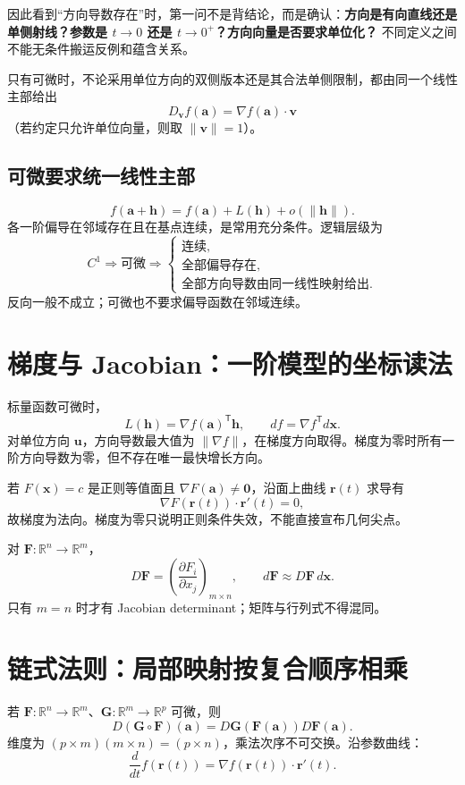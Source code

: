 \documentclass[11pt,a4paper,fontset=fandol]{ctexart}
\begin{document}
因此看到“方向导数存在”时，第一问不是背结论，而是确认：\textbf{方向是有向直线还是单侧射线？参数是 $t\to0$ 还是 $t\to0^+$？方向向量是否要求单位化？} 不同定义之间不能无条件搬运反例和蕴含关系。

只有可微时，不论采用单位方向的双侧版本还是其合法单侧限制，都由同一个线性主部给出
\[
D_{\mathbf v}f(\mathbf a)=\nabla f(\mathbf a)\cdot\mathbf v
\]
（若约定只允许单位向量，则取 $\lVert\mathbf v\rVert=1$）。

\subsection{可微要求统一线性主部}
\[
\boxed{f(\mathbf a+\mathbf h)
=f(\mathbf a)+L(\mathbf h)+o(\lVert\mathbf h\rVert)}.
\]
各一阶偏导在邻域存在且在基点连续，是常用充分条件。逻辑层级为
\[
C^1\Longrightarrow\text{可微}\Longrightarrow
\begin{cases}
\text{连续},\\
\text{全部偏导存在},\\
\text{全部方向导数由同一线性映射给出}.
\end{cases}
\]
反向一般不成立；可微也不要求偏导函数在邻域连续。

\section{梯度与 Jacobian：一阶模型的坐标读法}

标量函数可微时，
\[
L(\mathbf h)={\nabla f(\mathbf a)}^{\mathsf T}\mathbf h,
\qquad
df=\nabla f^{\mathsf T}d\mathbf x.
\]
对单位方向 $\mathbf u$，方向导数最大值为 $\lVert\nabla f\rVert$，在梯度方向取得。梯度为零时所有一阶方向导数为零，但不存在唯一最快增长方向。

若 $F(\mathbf x)=c$ 是正则等值面且 $\nabla F(\mathbf a)\ne\mathbf0$，沿面上曲线 $\mathbf r(t)$ 求导有
\[
\nabla F(\mathbf r(t))\cdot\mathbf r'(t)=0,
\]
故梯度为法向。梯度为零只说明正则条件失效，不能直接宣布几何尖点。

对 $\mathbf F:\mathbb R^n\to\mathbb R^m$，
\[
D\mathbf F={\left(\frac{\partial F_i}{\partial x_j}\right)}_{m\times n},
\qquad d\mathbf F\approx D\mathbf F\,d\mathbf x.
\]
只有 $m=n$ 时才有 Jacobian determinant；矩阵与行列式不得混同。

\section{链式法则：局部映射按复合顺序相乘}

若 $\mathbf F:\mathbb R^n\to\mathbb R^m$、$\mathbf G:\mathbb R^m\to\mathbb R^p$ 可微，则
\[
\boxed{D(\mathbf G\circ\mathbf F)(\mathbf a)
=D\mathbf G(\mathbf F(\mathbf a))D\mathbf F(\mathbf a)}.
\]
维度为 $(p\times m)(m\times n)=(p\times n)$，乘法次序不可交换。沿参数曲线：
\[
\frac d{dt}f(\mathbf r(t))=\nabla f(\mathbf r(t))\cdot\mathbf r'(t).
\]
\end{document}
